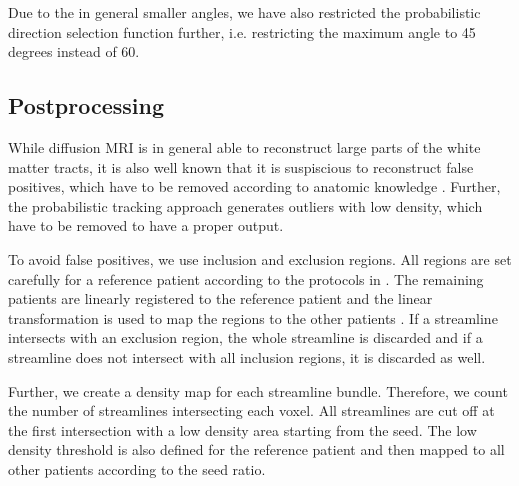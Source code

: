 Due to the in general smaller angles, we have also restricted the 
probabilistic direction selection function further, i.e. restricting
the maximum angle to 45 degrees instead of 60.  


\subsection{Postprocessing}
While diffusion MRI is in general able to reconstruct large parts of the white
matter tracts, it is also well known that it is suspiscious to reconstruct false
positives, which have to be removed according to anatomic knowledge
\cite{Wakana:2007, MaierHein:2017}. Further, the probabilistic tracking approach
generates outliers with low density, which have to be removed to have a proper
output. 

To avoid false positives, we use inclusion and exclusion regions. All regions
are set carefully for a reference patient according to the protocols in
\cite{MaierHein:2017}.
The remaining patients are linearly registered to the reference patient and the
linear transformation is used to map the regions to the other patients
\cite{FSL}.
If a streamline intersects with an exclusion region, the whole streamline is
discarded and if a streamline does not intersect with all inclusion regions, it
is discarded as well. 

Further, we create a density map for each streamline
bundle. Therefore, we count the number of streamlines intersecting each voxel.
All streamlines are cut off at the first intersection with a low density
area starting from the seed. The low density threshold is also defined for the
reference patient and then mapped to all other patients according to the seed
ratio.
